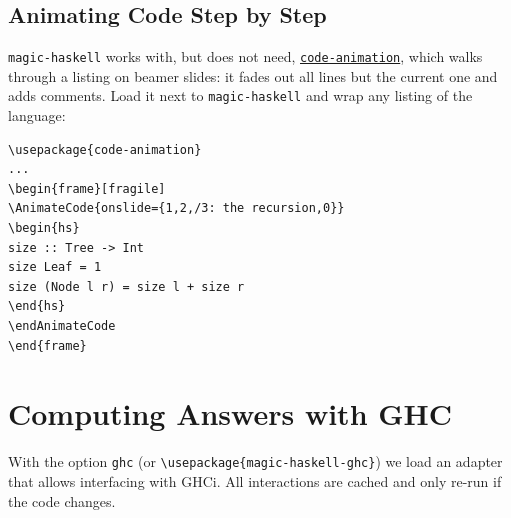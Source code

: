 \documentclass[10pt,DIV=12]{scrartcl}
\makeatletter
\let\T\texttt
\newcommand\pkg[1]{\href{\ifcsname pkgurl@#1\endcsname\csname pkgurl@#1\endcsname\else https://ctan.org/pkg/#1\fi}{\T{#1}}}
\newcommand\code{\lstinline[language=lLatex,language addons=latex,basicstyle=\ttfamily,columns=flexible,keepspaces]}
\makeatother
\begin{document}
\subsection{Animating Code Step by Step}\label{sec:animations}
\T{magic-haskell} works with, but does not need, \pkg{code-animation}, which walks through a listing on
beamer slides: it fades out all lines but the current one and adds comments. Load it next to
\T{magic-haskell} and wrap any listing of the language:
\begin{verbatim}
\usepackage{code-animation}
...
\begin{frame}[fragile]
\AnimateCode{onslide={1,2,/3: the recursion,0}}
\begin{hs}
size :: Tree -> Int
size Leaf = 1
size (Node l r) = size l + size r
\end{hs}
\endAnimateCode
\end{frame}
\end{verbatim}

\section{Computing Answers with GHC}\label{sec:ghc}
With the option \T{ghc} (or \code|\usepackage{magic-haskell-ghc}|) we load an adapter that allows interfacing with GHCi. All interactions are cached and only re-run if the code changes.
\end{document}

